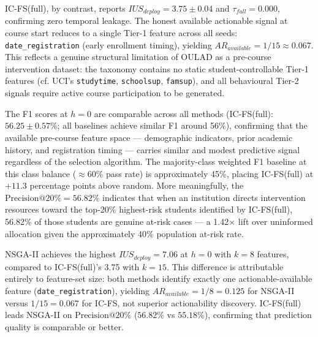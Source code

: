 \documentclass[a4paper,fleqn]{cas-sc}
\begin{document}
IC-FS(full), by contrast, reports $IUS_{deploy} = 3.75 \pm 0.04$ and $\tau_{full} = 0.000$, confirming zero temporal leakage. The honest available actionable signal at course start reduces to a single Tier-1 feature across all seeds: \texttt{date\_registration} (early enrollment timing), yielding $AR_{available} = 1/15 \approx 0.067$. This reflects a genuine structural limitation of OULAD as a pre-course intervention dataset: the taxonomy contains no static student-controllable Tier-1 features (cf. UCI's \texttt{studytime}, \texttt{schoolsup}, \texttt{famsup}), and all behavioural Tier-2 signals require active course participation to be generated.

The F1 scores at $h=0$ are comparable across all methods (IC-FS(full): $56.25 \pm 0.57\%$; all baselines achieve similar F1 around 56\%), confirming that the available pre-course feature space --- demographic indicators, prior academic history, and registration timing --- carries similar and modest predictive signal regardless of the selection algorithm. The majority-class weighted F1 baseline at this class balance ($\approx 60\%$ pass rate) is approximately 45\%, placing IC-FS(full) at $+11.3$ percentage points above random. More meaningfully, the $\text{Precision}@20\% = 56.82\%$ indicates that when an institution directs intervention resources toward the top-20\% highest-risk students identified by IC-FS(full), 56.82\% of those students are genuine at-risk cases --- a 1.42$\times$ lift over uninformed allocation given the approximately 40\% population at-risk rate.

NSGA-II achieves the highest $IUS_{deploy} = 7.06$ at $h=0$ with $k=8$ features, compared to IC-FS(full)'s 3.75 with $k=15$. This difference is attributable entirely to feature-set size: both methods identify exactly one actionable-available feature (\texttt{date\_registration}), yielding $AR_{available} = 1/8 = 0.125$ for NSGA-II versus $1/15 = 0.067$ for IC-FS, not superior actionability discovery. IC-FS(full) leads NSGA-II on $\text{Precision}@20\%$ ($56.82\%$ vs $55.18\%$), confirming that prediction quality is comparable or better.
\end{document}
